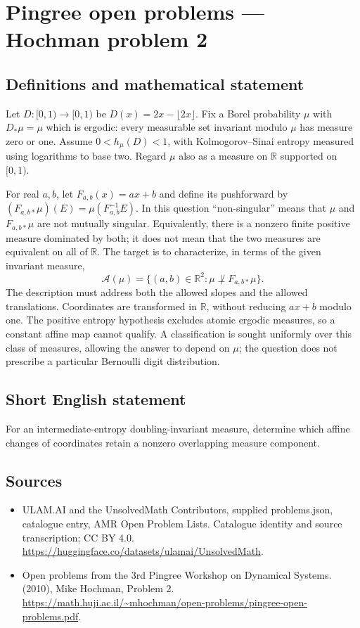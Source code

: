 \documentclass[11pt,a4paper]{article}
\begin{document}
\section*{Pingree open problems — Hochman problem 2}\label{statement}

\subsection{Definitions and mathematical statement}
Let $D:[0,1)\to[0,1)$ be $D(x)=2x-\lfloor2x\rfloor$. Fix a Borel probability
$\mu$ with $D_*\mu=\mu$ which is ergodic: every measurable set invariant
modulo $\mu$ has measure zero or one. Assume
$0<h_\mu(D)<1$, with Kolmogorov--Sinai entropy measured using logarithms
to base two. Regard $\mu$ also as a measure on $\mathbb R$ supported on $[0,1)$.

For real $a,b$, let $F_{a,b}(x)=ax+b$ and define its pushforward by
$(F_{a,b*}\mu)(E)=\mu(F_{a,b}^{-1}E)$. In this question ``non-singular''
means that $\mu$ and $F_{a,b*}\mu$ are not mutually singular. Equivalently,
there is a nonzero finite positive measure dominated by both; it does not
mean that the two measures are equivalent on all of $\mathbb R$.
The target is to characterize, in terms of the given invariant measure,
\[
 \mathcal A(\mu)=\{(a,b)\in\mathbb R^2:
                   \mu\not\perp F_{a,b*}\mu\}.
\]
The description must address both the allowed slopes and the allowed
translations. Coordinates are transformed in $\mathbb R$, without reducing
$ax+b$ modulo one. The positive entropy hypothesis excludes atomic ergodic
measures, so a constant affine map cannot qualify. A classification is sought
uniformly over this class of measures, allowing the answer to depend on $\mu$;
the question does not prescribe a particular Bernoulli digit distribution.
\subsection{Short English statement}
For an intermediate-entropy doubling-invariant measure, determine which affine changes of coordinates retain a nonzero overlapping measure component.
\subsection{Sources}
\begin{itemize}
\item[S1] ULAM.AI and the UnsolvedMath Contributors, supplied problems.json, catalogue entry, AMR Open Problem Lists. Catalogue identity and source transcription; CC BY 4.0.
\url{https://huggingface.co/datasets/ulamai/UnsolvedMath}.
\item[S2] Open problems from the 3rd Pingree Workshop on Dynamical Systems. (2010), Mike Hochman, Problem 2. 
\url{https://math.huji.ac.il/~mhochman/open-problems/pingree-open-problems.pdf}.
\end{itemize}
\end{document}
